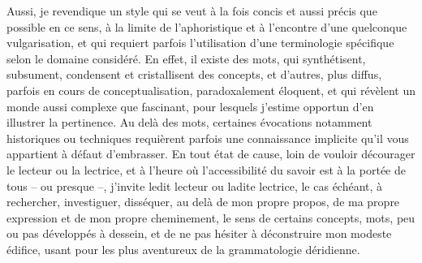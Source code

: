 Aussi, 
je revendique un style qui se veut à la fois concis et aussi précis que possible en ce sens, à la limite de l'aphoristique et à l'encontre d'une quelconque vulgarisation, et qui requiert parfois l'utilisation d'une terminologie spécifique selon le domaine considéré. En effet, il existe des mots, qui synthétisent, subsument, condensent et cristallisent des concepts, 
et d'autres, plus diffus, parfois en cours de conceptualisation, paradoxalement éloquent, 
et qui révèlent un monde aussi complexe que fascinant, pour lesquels j'estime opportun d'en illustrer la pertinence. 
Au delà des mots, certaines évocations notamment historiques ou techniques requièrent parfois une connaissance implicite qu'il vous appartient à défaut d'embrasser.
En tout état de cause, loin de vouloir décourager le lecteur ou la lectrice, et à l'heure où l'accessibilité du savoir est à la portée de tous -- ou presque --, j'invite ledit lecteur ou ladite lectrice, le cas échéant, à rechercher, investiguer, disséquer, au delà de mon propre propos, de ma propre expression et de mon propre cheminement, le sens de certains concepts, mots, peu ou pas développés à dessein, et de ne pas hésiter à déconstruire mon modeste édifice, usant pour les plus aventureux de la grammatologie déridienne. 

